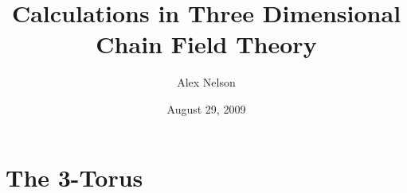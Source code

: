 \documentclass{amsart}
\title{Calculations in Three Dimensional Chain Field Theory}
\date{August 29, 2009}
\author{Alex Nelson}
\begin{document}
\maketitle

\section{The 3-Torus}

\end{document}
